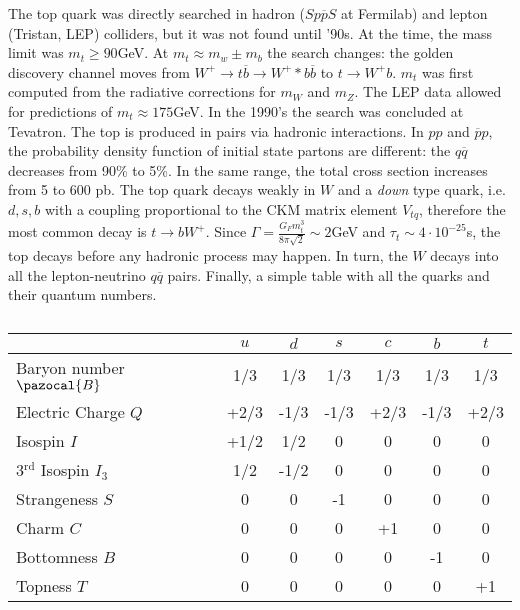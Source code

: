 \documentclass[10.75pt,a4paper,openright,bottom=2cm]{article}
\begin{document}
The top quark was directly searched in hadron ($Sp\overline{p}S$ at Fermilab) and lepton (Tristan, LEP) colliders, but it was not found until '90s. At the time, the mass limit was $m_t\ge90$\;GeV. At $m_t\approx m_w\pm m_b$ the search changes: the golden discovery channel moves from $W^+\to t\overline{b}\to W^+*b\overline{b}$ to $t\to W^+b$. $m_t$ was first computed from the radiative corrections for $m_W$ and $m_Z$. The LEP data allowed for predictions of $m_t\approx175$\;GeV. In the 1990's the search was concluded at Tevatron. The top is produced in pairs via hadronic interactions. In $pp$ and $\overline{p}p$, the probability density function of initial state partons are different: the $q\overline{q}$ decreases from 90\% to 5\%. In the same range, the total cross section increases from 5 to 600 pb. The top quark decays weakly in $W$ and a \textit{down} type quark, i.e. $d,s,b$ with a coupling proportional to the CKM matrix element $V_{tq}$, therefore the most common decay is $t\to bW^+$. Since $\Gamma=\frac{G_F m_t^3}{8\pi\sqrt{2}}\sim2$\;GeV and $\tau_t\sim4\cdot10^{-25}$\;s, the top decays before any hadronic process may happen. In turn, the $W$ decays into all the lepton-neutrino $q\overline{q}$ pairs. Finally, a simple table with all the quarks and their quantum numbers.
\begin{table}[h]
    \centering
    \begin{tabular}{l|cccccc}
    \hline
    \cellcolor{gray!50} & \cellcolor{yellow!50}$u$ & \cellcolor{yellow!50}$d$ & \cellcolor{yellow!50}$s$ & \cellcolor{yellow!50}$c$ & \cellcolor{yellow!50}$b$ & \cellcolor{yellow!50}$t$\\
    \hline\hline
    \cellcolor{yellow!50}Baryon number $\pazocal{B}$ & 1/3 & 1/3 & 1/3 & 1/3 & 1/3 & 1/3\\
    \hline
    \cellcolor{yellow!50}Electric Charge $Q$ & +2/3 & -1/3 & -1/3 & +2/3 & -1/3 & +2/3\\
    \hline
    \cellcolor{yellow!50}Isospin $I$ & +1/2 & 1/2 & 0 & 0 & 0 & 0\\
    \hline
    \cellcolor{yellow!50}3$^{\text{rd}}$ Isospin $I_3$ & 1/2 & -1/2 & 0 & 0 & 0 & 0\\
    \hline
    \cellcolor{yellow!50}Strangeness $S$ & 0 & 0 & -1 & 0 & 0 & 0\\
    \hline
    \cellcolor{yellow!50}Charm $C$ & 0 & 0 & 0 & +1 & 0 & 0\\
    \hline
    \cellcolor{yellow!50}Bottomness $B$ & 0 & 0 & 0 & 0 & -1 & 0\\
    \hline
    \cellcolor{yellow!50}Topness $T$ & 0 & 0 & 0 & 0 & 0 & +1\\
    \hline
    \end{tabular}
    \caption*{}
    \label{tab:my_label}
\end{table}
\newpage
\end{document}
